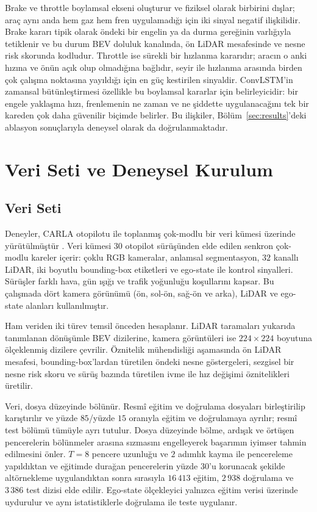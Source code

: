 \documentclass[conference]{IEEEtran}
\begin{document}
Brake ve throttle boylamsal ekseni oluşturur ve fiziksel olarak birbirini dışlar; araç aynı anda hem gaz hem fren uygulamadığı için iki sinyal negatif ilişkilidir. Brake kararı tipik olarak öndeki bir engelin ya da durma gereğinin varlığıyla tetiklenir ve bu durum BEV doluluk kanalında, ön LiDAR mesafesinde ve nesne risk skorunda kodludur. Throttle ise sürekli bir hızlanma kararıdır; aracın o anki hızına ve önün açık olup olmadığına bağlıdır, seyir ile hızlanma arasında birden çok çalışma noktasına yayıldığı için en güç kestirilen sinyaldir. ConvLSTM'in zamansal bütünleştirmesi özellikle bu boylamsal kararlar için belirleyicidir: bir engele yaklaşma hızı, frenlemenin ne zaman ve ne şiddette uygulanacağını tek bir kareden çok daha güvenilir biçimde belirler. Bu ilişkiler, Bölüm~\ref{sec:results}'deki ablasyon sonuçlarıyla deneysel olarak da doğrulanmaktadır.

\section{Veri Seti ve Deneysel Kurulum}

\subsection{Veri Seti}

Deneyler, CARLA otopilotu ile toplanmış çok-modlu bir veri kümesi üzerinde yürütülmüştür \cite{immanuel_peter_2025}. Veri kümesi $30$ otopilot sürüşünden elde edilen senkron çok-modlu kareler içerir: çoklu RGB kameralar, anlamsal segmentasyon, $32$ kanallı LiDAR, iki boyutlu bounding-box etiketleri ve ego-state ile kontrol sinyalleri. Sürüşler farklı hava, gün ışığı ve trafik yoğunluğu koşullarını kapsar. Bu çalışmada dört kamera görünümü (ön, sol-ön, sağ-ön ve arka), LiDAR ve ego-state alanları kullanılmıştır.

Ham veriden iki türev temsil önceden hesaplanır. LiDAR taramaları yukarıda tanımlanan dönüşümle BEV dizilerine, kamera görüntüleri ise $224\times224$ boyutuna ölçeklenmiş dizilere çevrilir. Öznitelik mühendisliği aşamasında ön LiDAR mesafesi, bounding-box'lardan türetilen öndeki nesne göstergeleri, sezgisel bir nesne risk skoru ve sürüş bazında türetilen ivme ile hız değişimi öznitelikleri üretilir.

Veri, dosya düzeyinde bölünür. Resmî eğitim ve doğrulama dosyaları birleştirilip karıştırılır ve yüzde $85$/yüzde $15$ oranıyla eğitim ve doğrulamaya ayrılır; resmî test bölümü tümüyle ayrı tutulur. Dosya düzeyinde bölme, ardışık ve örtüşen pencerelerin bölünmeler arasına sızmasını engelleyerek başarımın iyimser tahmin edilmesini önler. $T=8$ pencere uzunluğu ve $2$ adımlık kayma ile pencereleme yapıldıktan ve eğitimde durağan pencerelerin yüzde $30$'u korunacak şekilde altörnekleme uygulandıktan sonra sırasıyla $16\,413$ eğitim, $2\,938$ doğrulama ve $3\,386$ test dizisi elde edilir. Ego-state ölçekleyici yalnızca eğitim verisi üzerinde uydurulur ve aynı istatistiklerle doğrulama ile teste uygulanır.
\end{document}
